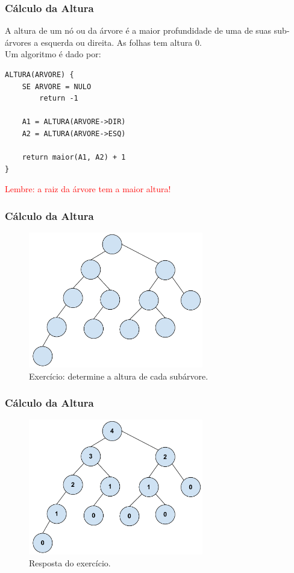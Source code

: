 \begin{frame}[fragile]
\frametitle{Cálculo da Altura}

\begin{block}{}
A altura de um nó ou da árvore é a maior profundidade de uma de 
suas sub-árvores a esquerda ou direita. As folhas tem altura 0.\\
 Um algoritmo é  dado por:
\end{block}

\begin{verbatim}
ALTURA(ARVORE) {
    SE ARVORE = NULO
        return -1
        
    A1 = ALTURA(ARVORE->DIR)
    A2 = ALTURA(ARVORE->ESQ)
    
    return maior(A1, A2) + 1
}
\end{verbatim}

\textcolor{red}{Lembre: a raiz da árvore tem a maior altura!}

\end{frame}

\begin{frame}
\frametitle{Cálculo da Altura}


\begin{figure}[tbp]
\includegraphics[keepaspectratio=true,width=3in]{figs/fig_arvores/altura1}
\centering
\caption{Exercício: determine a altura de cada subárvore.}
\end{figure}

\end{frame}

\begin{frame}
\frametitle{Cálculo da Altura}

\begin{figure}[tbp]
\includegraphics[keepaspectratio=true,width=3in]{figs/fig_arvores/altura2}
\centering
\caption{Resposta do exercício.}
\end{figure}

\end{frame}

